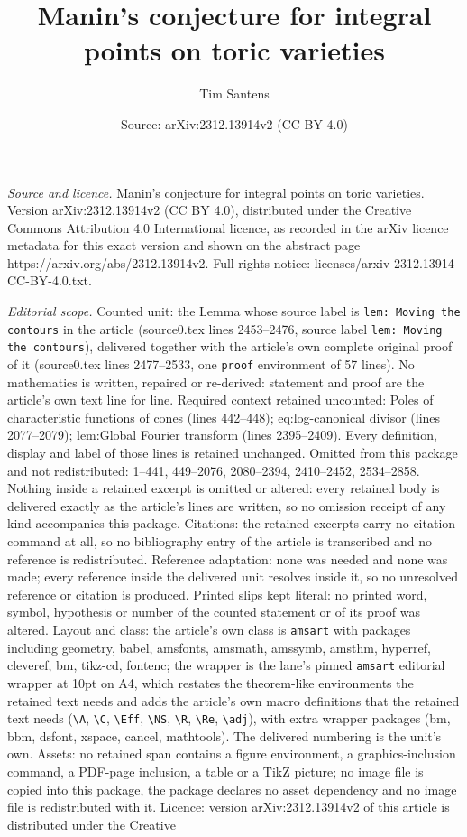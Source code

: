 \documentclass[10pt,a4paper]{amsart}
\title[Manin's conjecture for integral points on toric varieties]{Manin's conjecture for integral points on toric varieties}
\author{Tim Santens}
\date{Source: arXiv:2312.13914v2 (CC BY 4.0)}
\begin{document}
\maketitle

\noindent\emph{Source and licence.} Manin's conjecture for integral points on toric varieties. Version arXiv:2312.13914v2 (CC BY 4.0), distributed under the Creative Commons Attribution 4.0 International licence, as recorded in the arXiv licence metadata for this exact version and shown on the abstract page https://arxiv.org/abs/2312.13914v2. Full rights notice: licenses/arxiv-2312.13914-CC-BY-4.0.txt.\par\smallskip

\noindent\textit{Editorial scope.} Counted unit: the Lemma whose source label is \texttt{lem: Moving the contours} in the article (source0.tex lines 2453--2476, source label \texttt{lem: Moving the contours}), delivered together with the article's own complete original proof of it (source0.tex lines 2477--2533, one \texttt{proof} environment of 57 lines). No mathematics is written, repaired or re-derived: statement and proof are the article's own text line for line. Required context retained uncounted: Poles of characteristic functions of cones (lines 442--448); eq:log-canonical divisor (lines 2077--2079); lem:Global Fourier transform (lines 2395--2409). Every definition, display and label of those lines is retained unchanged. Omitted from this package and not redistributed: 1--441, 449--2076, 2080--2394, 2410--2452, 2534--2858. Nothing inside a retained excerpt is omitted or altered: every retained body is delivered exactly as the article's lines are written, so no omission receipt of any kind accompanies this package. Citations: the retained excerpts carry no citation command at all, so no bibliography entry of the article is transcribed and no reference is redistributed. Reference adaptation: none was needed and none was made; every reference inside the delivered unit resolves inside it, so no unresolved reference or citation is produced. Printed slips kept literal: no printed word, symbol, hypothesis or number of the counted statement or of its proof was altered. Layout and class: the article's own class is \texttt{amsart} with packages including geometry, babel, amsfonts, amsmath, amssymb, amsthm, hyperref, cleveref, bm, tikz-cd, fontenc; the wrapper is the lane's pinned \texttt{amsart} editorial wrapper at 10pt on A4, which restates the theorem-like environments the retained text needs and adds the article's own macro definitions that the retained text needs (\texttt{\textbackslash A}, \texttt{\textbackslash C}, \texttt{\textbackslash Eff}, \texttt{\textbackslash NS}, \texttt{\textbackslash R}, \texttt{\textbackslash Re}, \texttt{\textbackslash adj}), with extra wrapper packages (bm, bbm, dsfont, xspace, cancel, mathtools). The delivered numbering is the unit's own. Assets: no retained span contains a figure environment, a graphics-inclusion command, a PDF-page inclusion, a table or a TikZ picture; no image file is copied into this package, the package declares no asset dependency and no image file is redistributed with it. Licence: version arXiv:2312.13914v2 of this article is distributed under the Creative 
\end{document}
